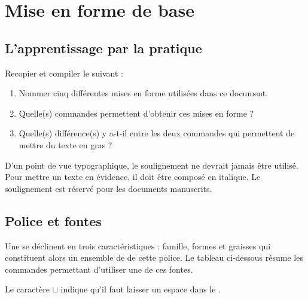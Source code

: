 \documentclass[10pt,french]{book}
\begin{document}
\thispagestyle{empty}

\section{Mise en forme de base}

\subsection{L'apprentissage par la pratique}

Recopier et compiler le  suivant :


\begin{enumerate}
    \item Nommer cinq différentes mises en forme utilisées dans ce document.
    \item Quelle(s) commandes permettent d'obtenir ces mises en forme ?
    \item Quelle(s) différence(s) y a-t-il entre les deux commandes qui permettent de mettre du texte en gras ?
\end{enumerate}

\begin{info}
    D'un point de vue typographique, le soulignement ne devrait jamais être utilisé. Pour mettre un texte en évidence, il doit être composé en italique. Le soulignement est réservé pour les documents manuscrits.
\end{info}

\subsection{Police et fontes}

Une  se déclinent en trois caractéristiques : famille, formes et graisses qui constituent alors un ensemble de  de cette police. Le tableau ci-dessous résume les commandes permettant d'utiliser une de ces fontes.

\begin{info}
	Le caractère $\sqcup$ indique qu'il faut laisser un espace dans le .
\end{info}
\end{document}
